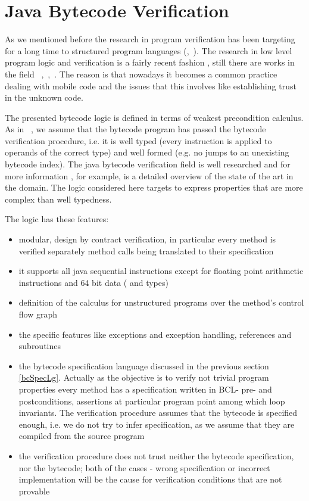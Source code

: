
\section{Java Bytecode Verification}\label{verifCond}
As we mentioned before the research in program verification has been targeting for a long time to structured program languages (\cite{WPCDS},~\cite{DisDij}). 
The research in low level program logic and verification is a fairly recent fashion , still there are works in the field ~\cite{B04tlsj},~\cite{BM05plb},~\cite{Quigley}.
The reason is that nowadays it becomes a common practice dealing with mobile code and the issues that this involves like 
establishing trust in the unknown code. 

The presented bytecode logic is defined in terms of weakest precondition calculus. As in ~\cite{BM05plb}, we assume 
that the bytecode program has passed the bytecode verification procedure, i.e. it is well typed 
(every instruction is applied to operands of the correct type) and well formed 
(e.g. no jumps to an unexisting bytecode index). The java bytecode verification field is  well researched and 
for more information \cite{Ljbc}, for example, is a detailed overview of the state of the art in the domain. 
The logic considered here targets to express properties that are more complex than well typedness.

The logic has these features:
\begin{itemize}
\item modular, design by contract verification, in particular every method is verified separately method calls being translated to their specification 
\item it supports all java sequential instructions except for floating point arithmetic instructions and 64 bit data ( and  types)
\item definition of the calculus for unstructured programs over the method's control flow graph
\item the specific features like exceptions and exception handling, references and subroutines
\item the bytecode specification language discussed in the previous section \ref{bcSpecLg}. 
Actually as the objective is to verify not trivial program properties every method has a specification written 
in BCL- pre- and postconditions, assertions at particular program point among 
which loop invariants. The verification procedure assumes that the bytecode is specified enough, i.e. 
we do not try to infer specification, as we assume that they are compiled from the source program
\item the verification procedure does not trust neither the bytecode specification, nor the bytecode; both of the cases - wrong 
specification or incorrect implementation will be the cause for verification conditions that are not provable 
\end{itemize}

